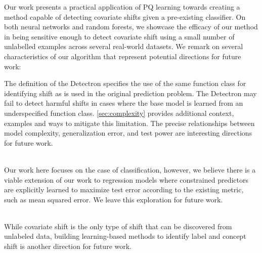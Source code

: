 Our work presents a practical application of PQ learning towards creating a method capable of detecting covariate shifts given a pre-existing classifier.
On both neural networks and random forests, we showcase the efficacy of our method in being sensitive enough to detect covariate shift using a small number of unlabelled examples across several real-world datasets.
We remark on several characteristics of our algorithm that represent potential directions for future work:

 The definition of the Detectron specifies the use of the same function class for identifying shift as is used in the original prediction problem.
The Detectron may fail to detect harmful shifts in cases where the base model is learned from an underspecified function class. \autoref{sec:complexity} provides additional context, examples and ways to mitigate this limitation.
The precise relationships between model complexity, generalization error, and test power are interesting directions for future work.

\\
Our work here focuses on the case of classification, however, we believe there is a viable extension of our work to regression models where constrained predictors are explicitly learned to maximize test error according to the existing metric, such as mean squared error.
We leave this exploration for future work.

 \\
While covariate shift is the only type of shift that can be discovered from unlabeled data,
 building learning-based methods to identify label and concept shift is another direction for future work.
